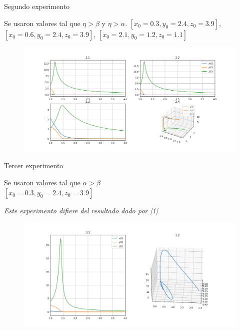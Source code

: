 \documentclass{beamer}
\begin{document}
\begin{frame}
    {Segundo experimento}

    Se usaron valores tal que $\eta > \beta$ y $\eta > \alpha$.
    $[x_0=0.3, y_0=2.4, z_0=3.9]$,
    $[x_0=0.6, y_0=2.4, z_0=3.9]$, $[x_0=2.1, y_0=1.2, z_0=1.1]$

    \begin{figure}[h!]
        \includegraphics[width=\linewidth]{../numerical_models/images/2.png}
    \end{figure}

\end{frame}
\begin{frame}
    {Tercer experimento}

    Se usaron valores tal que $\alpha > \beta$\\
    $[x_0=0.3, y_0=2.4, z_0=3.9]$


    {\it\scriptsize Este experimento difiere del resultado dado por [1]}

    \begin{figure}[h!]
        \includegraphics[width=\linewidth]{../numerical_models/images/3.png}
    \end{figure}

\end{frame}
\end{document}
